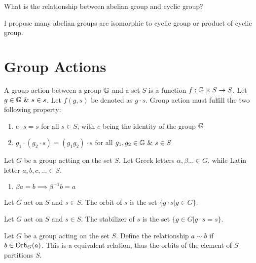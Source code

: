 \documentclass[../note.tex]{subfiles}
\begin{document}
\begin{hypothesis}
	What is the relationship between abelian group and cyclic group? 

	I propose many abelian groups are isomorphic to cyclic group or product of cyclic group.
\end{hypothesis}

\section{Group Actions}
\begin{definition}
	A group action between a group $\mathbb{G}$ and a set $S$ is a function $f: \mathbb{G}\times S \rightarrow S$. 
	Let $g\in \mathbb{G} \ \&\ s \in s$. Let $f(g,s)$ be denoted as $g\cdot s$. Group action must fulfill the two following property:
	\begin{enumerate}
		\item $e\cdot s=s$ for all $s\in S$, with $e$ being the identity of the group $\mathbb{G}$
		\item $g_1\cdot(g_2 \cdot s) = (g_1 g_2) \cdot s$ for all $g_1, g_2 \in \mathbb{G}\ \&\ s \in S$
	\end{enumerate}
\end{definition}

\begin{theorem}
	Let $G$ be a group actting on the set $S$. Let Greek letters $\alpha, \beta \dots \in G$, while Latin letter $a,b,c, \dots \in S$.
	\begin{enumerate}
		\item $\beta a = b \implies \beta^{-1} b = a$ 
	\end{enumerate}
\end{theorem}
\begin{definition}[Orbit]
	Let $G$ act on $S$ and $s \in S$. The orbit of $s$ is the set $\{g\cdot s | g \in G\}$.	
\end{definition}

\begin{definition}[Stabilizer]
	Let $G$ act on $S$ and $s \in S$. The stabilizer of $s$ is the set $\{g \in G | g\cdot s = s\}$.
\end{definition}

\begin{theorem}
	Let $G$ be a group acting on the set $S$.
	Define the relationship $a\sim b$ if $b\in \text{Orb}_{G}({a})$.
	This is a equivalent relation; thus the orbits of the element of $S$ partitions $S$.
\end{theorem}
\end{document}
